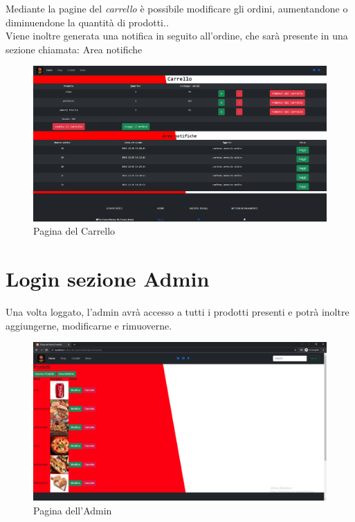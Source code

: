 \documentclass[a4paper,12pt]{report}
\begin{document}
	\textsf{\small Mediante la pagine del \emph{carrello} è possibile modificare gli ordini, aumentandone o diminuendone la quantità di prodotti.}.\\
	Viene inoltre generata una notifica in seguito all'ordine, che sarà presente in una sezione chiamata: Area notifiche
	
	\begin{figure}[H] 
		\centering
		\includegraphics[width=1\textwidth, height=1\textheight, keepaspectratio]{./Images/Carrello_e_notifiche.png}
		\caption{Pagina del Carrello}
		\label{fig:carrello}
	\end{figure}
	
	


	
	
	\newpage
	
	\section{Login sezione Admin}
	
	\textsf{\small Una volta loggato, l'admin avrà accesso a tutti i prodotti presenti e potrà inoltre aggiungerne, modificarne e rimuoverne.}\\
	
	\begin{figure}[H] 
		\centering
		\includegraphics[width=1\textwidth, height=1\textheight, keepaspectratio]{./Images/Admin.png}
		\caption{Pagina dell'Admin}
		\label{fig:admin}
	\end{figure}
\end{document}
